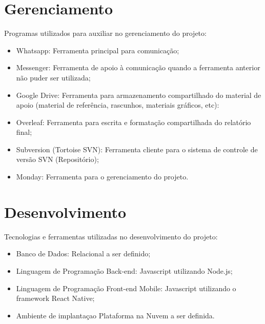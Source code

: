 \documentclass[
    12pt,               %
    openright,          %
    oneside,
    a4paper,            %
    draft,              %
    MODELO,             %
    TODO,               %
    english,            %
    brazil              %
    ]{ifsp-spo-inf-ctds}
\begin{document}
\section{Gerenciamento}
Programas utilizados para auxiliar no gerenciamento do projeto:

\begin{itemize}
\item Whatsapp: Ferramenta principal para comunicação;
\item Messenger: Ferramenta de apoio à comunicação quando a ferramenta anterior não puder ser utilizada;
\item Google Drive: Ferramenta para armazenamento compartilhado do material de apoio (material de referência, rascunhos, materiais gráficos, etc): 
\item Overleaf: Ferramenta para escrita e formatação compartilhada do relatório final;
\item Subversion (Tortoise SVN): Ferramenta cliente para o sistema de controle de versão SVN (Repositório);
\item Monday: Ferramenta para o gerenciamento do projeto.
\end{itemize}

\section{Desenvolvimento}
Tecnologias e ferramentas utilizadas no desenvolvimento do projeto:

\begin{itemize}
\item Banco de Dados: Relacional a ser definido;
\item Linguagem de Programação Back-end: Javascript utilizando Node.js;
\item Linguagem de Programação Front-end Mobile: Javascript utilizando o framework React Native;
\item Ambiente de implantaçao Plataforma na Nuvem a ser definida.
\end{itemize}


\end{document}
